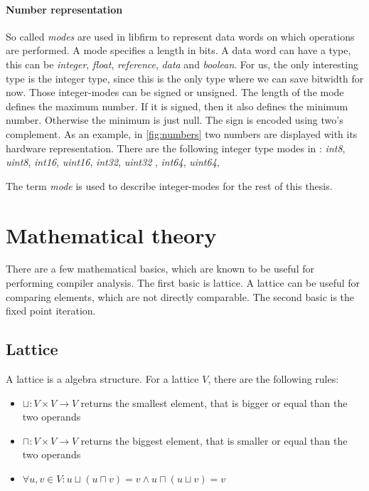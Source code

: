 \paragraph{Number representation}
So called \textit{modes} are used in libfirm to represent data words on which operations are performed. A mode specifies a length in bits. A data word can have a type, this can be \textit{integer}, \textit{float}, \textit{reference}, \textit{data} and \textit{boolean}. For us, the only interesting type is the integer type, since this is the only type where we can save bitwidth for now. Those integer-modes can be signed or unsigned. The length of the mode defines the maximum number. If it is signed, then it also defines the minimum number. Otherwise the minimum is just null. The sign is encoded using two's complement. As an example, in \autoref{fig:numbers} two numbers are displayed with its hardware representation. There are the following integer type modes in \libFIRM : 
\textit{int8},
\textit{uint8},
\textit{int16},
\textit{uint16},
\textit{int32},
\textit{uint32} ,
\textit{int64},
\textit{uint64},

The term \textit{mode} is used to describe integer-modes for the rest of this thesis.


\section{Mathematical theory}

There are a few mathematical basics, which are known to be useful for performing compiler analysis. The first basic is lattice. A lattice can be useful for comparing elements, which are not directly comparable. The second basic is the fixed point iteration.

\subsection{Lattice}

A lattice is a algebra structure. For a lattice $V$, there are the following rules:

\begin{itemize}
	\item $\sqcup: V \times V \rightarrow V$ returns the smallest element, that is bigger or equal than the two operands
	\item $\sqcap: V \times V \rightarrow V$ returns the biggest element, that is smaller or equal than the two operands
	\item $\forall u,v \in V : u \sqcup ( u \sqcap v) = v \wedge u \sqcap ( u \sqcup v ) = v$
\end{itemize}

